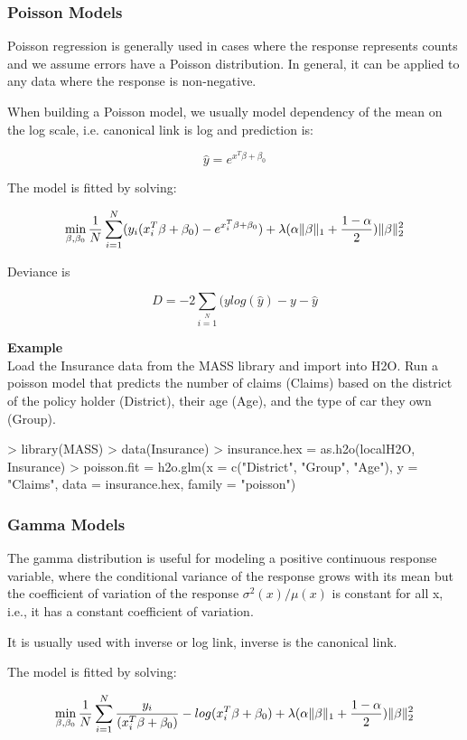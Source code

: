 \documentclass[11pt]{article}
\begin{document}
\subsubsection{Poisson Models}
Poisson regression is generally used in cases where the response represents counts and we assume errors have a Poisson distribution. In general, it can be applied to any data where the response is non-negative. 

When building a Poisson model, we usually model dependency of the mean on the log scale, i.e. canonical link is log and prediction is:

\[\hat{y} = e^{x^T\beta + \beta_0}\]

The model is fitted by solving:

\[  \min\limits_{\beta,\beta_0} { {1 \over N}\sum\limits_{i=1}\limits^{N}(y_i (x_i^{T}\beta  + \beta_0) - e^{x_i^{T}\beta  + \beta_0})  + \lambda (\alpha \|\beta \|_1 + {1-\alpha \over 2}) \| \beta \|_2^2} \]

Deviance is 

\[D = -2\sum\limits_{i=1}\limits^{N}{(y log(\hat{y}) - y - \hat{y}}\]


\textbf{Example}\\
Load the Insurance data from the MASS library and import into H2O. Run a poisson model that predicts the number of claims (Claims) based on the district of the policy holder (District), their age (Age), and the type of car they own (Group).
\begin{spverbatim}
> library(MASS)
> data(Insurance)
> insurance.hex = as.h2o(localH2O, Insurance)
> poisson.fit = h2o.glm(x = c("District", "Group", "Age"), y = "Claims", 
data = insurance.hex, family = "poisson")
\end{spverbatim}

\subsubsection{Gamma Models}
The gamma distribution is useful for modeling a positive continuous response variable, where the conditional variance of the response grows with its mean but  the coefficient of variation of the response $\sigma^2(x)/μ(x)$ is constant for all x,  i.e., it has a constant coefficient of variation.

It is usually used with inverse or log link, inverse is the canonical link.

The model is fitted by solving:

\[  \min\limits_{\beta,\beta_0} { {1 \over N}\sum\limits_{i=1}\limits^{N}{y_i \over (x_i^{T}\beta  + \beta_0)} - log({x_i^{T}\beta  + \beta_0})  + \lambda (\alpha \|\beta \|_1 + {1-\alpha \over 2}) \| \beta \|_2^2} \]
\end{document}
